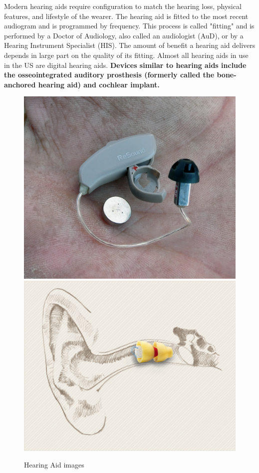 \documentclass[12pt]{article}
\begin{document}
Modern hearing aids require configuration to match the hearing loss, physical features, and lifestyle of the wearer. The hearing aid is fitted to the most recent audiogram and is programmed by frequency. This process is called "fitting" and is performed by a Doctor of Audiology, also called an audiologist (AuD), or by a Hearing Instrument Specialist (HIS). The amount of benefit a hearing aid delivers depends in large part on the quality of its fitting. Almost all hearing aids in use in the US are digital hearing aids.
\textbf{Devices similar to hearing aids include the osseointegrated auditory prosthesis (formerly called the bone-anchored hearing aid) and cochlear implant.}
\begin{figure}[h]
\centering
\includegraphics[scale=0.3]{hear.jpg}\includegraphics[scale=0.6]{hear1.jpg}
\caption{Hearing Aid images}
\end{figure}
\end{document}
